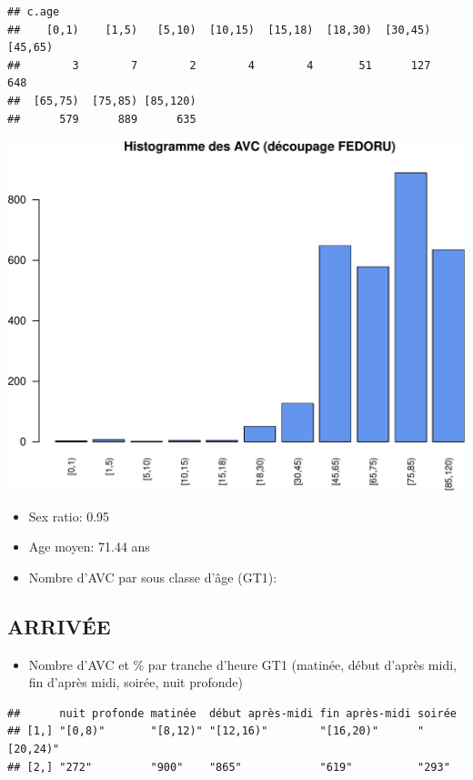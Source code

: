 \documentclass[]{article}
\begin{document}
\begin{verbatim}
## c.age
##    [0,1)    [1,5)   [5,10)  [10,15)  [15,18)  [18,30)  [30,45)  [45,65) 
##        3        7        2        4        4       51      127      648 
##  [65,75)  [75,85) [85,120) 
##      579      889      635
\end{verbatim}

\includegraphics{rapport2014_V4_files/figure-latex/patients-2.pdf}

\begin{itemize}
\itemsep1pt\parskip0pt
\item
  Sex ratio: 0.95
\item
  Age moyen: 71.44 ans
\item
  Nombre d'AVC par sous classe d'âge (GT1):
\end{itemize}

\subsection{ARRIVÉE}\label{arrivee-2}

\begin{itemize}
\itemsep1pt\parskip0pt
\item
  Nombre d'AVC et \% par tranche d'heure GT1 (matinée, début d'après
  midi, fin d'après midi, soirée, nuit profonde)
\end{itemize}

\begin{verbatim}
##      nuit profonde matinée  début après-midi fin après-midi soirée   
## [1,] "[0,8)"       "[8,12)" "[12,16)"        "[16,20)"      "[20,24)"
## [2,] "272"         "900"    "865"            "619"          "293"
\end{verbatim}
\end{document}
